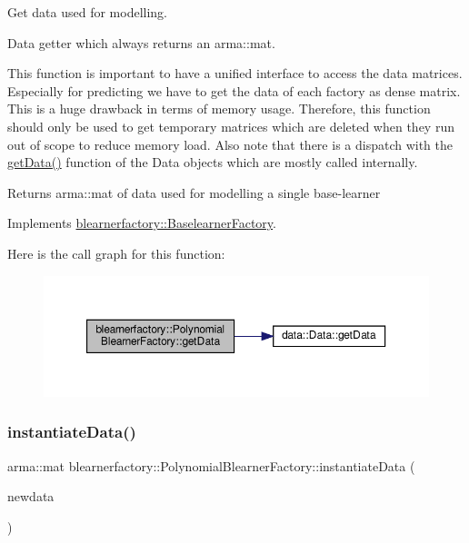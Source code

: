 Get data used for modelling. 

Data getter which always returns an arma\+::mat.

This function is important to have a unified interface to access the data matrices. Especially for predicting we have to get the data of each factory as dense matrix. This is a huge drawback in terms of memory usage. Therefore, this function should only be used to get temporary matrices which are deleted when they run out of scope to reduce memory load. Also note that there is a dispatch with the \hyperlink{classblearnerfactory_1_1_polynomial_blearner_factory_addce36fbb590b2cd3d9325b53ae74566}{get\+Data()} function of the Data objects which are mostly called internally.

\begin{DoxyReturn}{Returns}
{\ttfamily arma\+::mat} of data used for modelling a single base-\/learner 
\end{DoxyReturn}


Implements \hyperlink{classblearnerfactory_1_1_baselearner_factory_aa3e4580bca870ca3b742dda6c820e1e6}{blearnerfactory\+::\+Baselearner\+Factory}.

Here is the call graph for this function\+:\nopagebreak
\begin{figure}[H]
\begin{center}
\leavevmode
\includegraphics[width=350pt]{classblearnerfactory_1_1_polynomial_blearner_factory_addce36fbb590b2cd3d9325b53ae74566_cgraph}
\end{center}
\end{figure}
\mbox{\label{classblearnerfactory_1_1_polynomial_blearner_factory_aeea9c480671ae7cf7d3be470ce0feaef}} 
\subsubsection{\texorpdfstring{instantiate\+Data()}{instantiateData()}}
{\footnotesize\ttfamily arma\+::mat blearnerfactory\+::\+Polynomial\+Blearner\+Factory\+::instantiate\+Data (\begin{DoxyParamCaption}\item[{const arma\+::mat \&}]{newdata }\end{DoxyParamCaption})\hspace{0.3cm}{\ttfamily [virtual]}}



